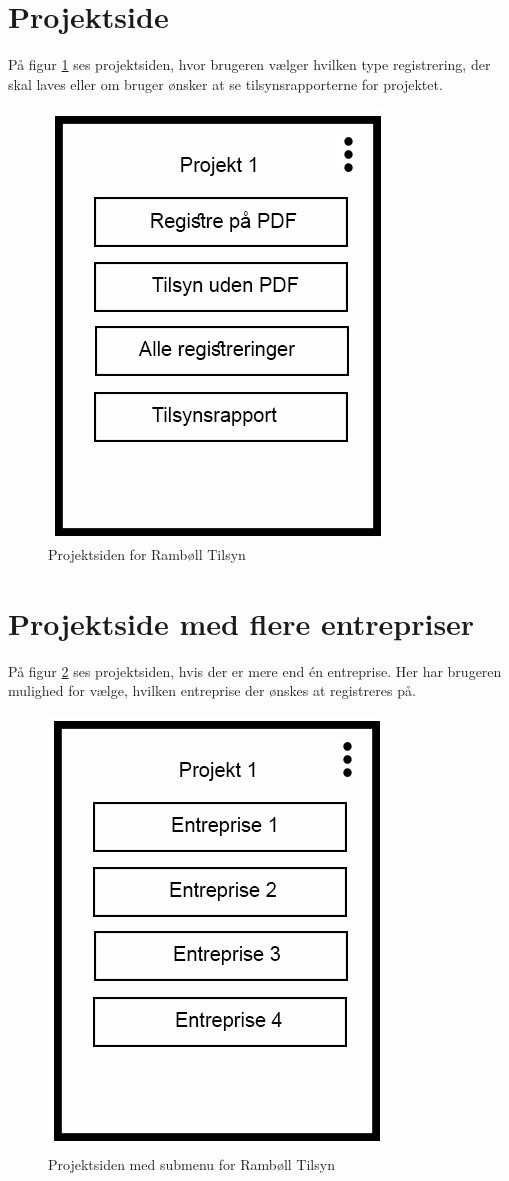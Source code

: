 \section{Projektside}\label{sec:ProjektsideMock}
På figur \ref{fig:ProjektsideMock} ses projektsiden, hvor brugeren vælger hvilken type registrering, der skal laves eller om bruger ønsker at se tilsynsrapporterne for projektet.

\begin{figure}[H]
	\centering
	\includegraphics[width=0.4\linewidth]{MockUps/Mock/Ramboell-Registrer}
	\caption{Projektsiden for Rambøll Tilsyn}
	\label{fig:ProjektsideMock}
\end{figure}

\clearpage

\section{Projektside med flere entrepriser}\label{sec:ProjektsideEntrepriseMock}
På figur \ref{fig:ProjektsideEntrepriseMock} ses projektsiden, hvis der er mere end én entreprise. Her har brugeren mulighed for vælge, hvilken entreprise der ønskes at registreres på.

\begin{figure}[H]
	\centering
	\includegraphics[width=0.4\linewidth]{MockUps/Mock/Ramboell-Entreprise}
	\caption{Projektsiden med submenu for Rambøll Tilsyn}
	\label{fig:ProjektsideEntrepriseMock}
\end{figure}

